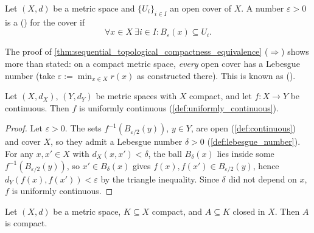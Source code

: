 \begin{definition}
\label{def:lebesgue_number}
Let $(X,d)$ be a metric space and $\{U_i\}_{i\in I}$ an open cover of $X$. A number
$\varepsilon > 0$ is a  () for the cover if
\[\forall x \in X\ \exists i \in I: B_\varepsilon(x) \subseteq U_i.\]
\end{definition}

\begin{remark}
The proof of \cref{thm:sequential_topological_compactness_equivalence} ($\Rightarrow$) shows
more than stated: on a compact metric space, \emph{every} open cover has a Lebesgue number (take
$\varepsilon := \min_{x\in X} r(x)$ as constructed there). This is known as  ().
\end{remark}

\begin{proposition}
\label{prop:compact_implies_uniformly_continuous}
Let $(X,d_X)$, $(Y,d_Y)$ be metric spaces with $X$ compact, and let $f : X \to Y$ be continuous.
Then $f$ is uniformly continuous (\cref{def:uniformly_continuous}).
\end{proposition}

\begin{proof}
Let $\varepsilon > 0$. The sets $f^{-1}(B_{\varepsilon/2}(y))$, $y \in Y$, are open
(\cref{def:continuous}) and cover $X$, so they admit a Lebesgue number $\delta > 0$
(\cref{def:lebesgue_number}). For any $x,x' \in X$ with $d_X(x,x') < \delta$, the ball
$B_\delta(x)$ lies inside some $f^{-1}(B_{\varepsilon/2}(y))$, so $x' \in B_\delta(x)$ gives
$f(x),f(x') \in B_{\varepsilon/2}(y)$, hence $d_Y(f(x),f(x')) < \varepsilon$ by the triangle
inequality. Since $\delta$ did not depend on $x$, $f$ is uniformly continuous.
\end{proof}

\begin{proposition}
\label{prop:closed_subset_of_compact}
Let $(X,d)$ be a metric space, $K \subseteq X$ compact, and $A \subseteq K$ closed in $X$. Then
$A$ is compact.
\end{proposition}

